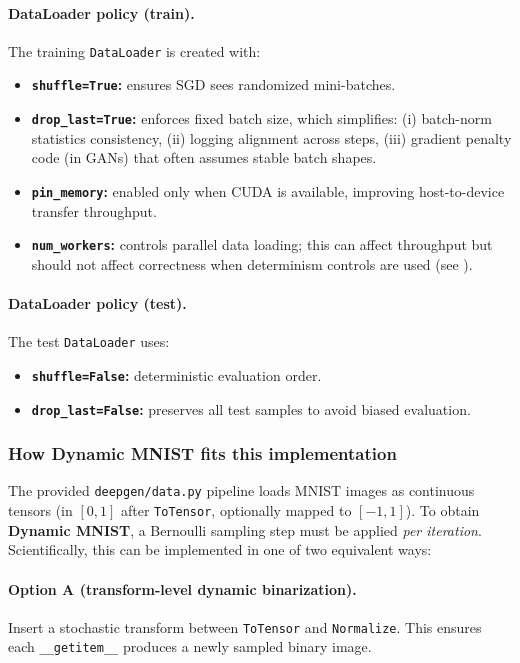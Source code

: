 \paragraph{DataLoader policy (train).}
The training \texttt{DataLoader} is created with:
\begin{itemize}
  \item \textbf{\texttt{shuffle=True}:} ensures SGD sees randomized mini-batches.
  \item \textbf{\texttt{drop\_last=True}:} enforces fixed batch size, which simplifies:
  (i) batch-norm statistics consistency,
  (ii) logging alignment across steps,
  (iii) gradient penalty code (in GANs) that often assumes stable batch shapes.
  \item \textbf{\texttt{pin\_memory}:} enabled only when CUDA is available, improving host-to-device transfer throughput.
  \item \textbf{\texttt{num\_workers}:} controls parallel data loading; this can affect throughput but should not affect correctness when determinism controls are used (see ).
\end{itemize}

\paragraph{DataLoader policy (test).}
The test \texttt{DataLoader} uses:
\begin{itemize}
  \item \textbf{\texttt{shuffle=False}:} deterministic evaluation order.
  \item \textbf{\texttt{drop\_last=False}:} preserves all test samples to avoid biased evaluation.
\end{itemize}

\subsubsection{How Dynamic MNIST fits this implementation}
\label{subsubsec:dynamic_mnist_in_code}
The provided \texttt{deepgen/data.py} pipeline loads MNIST images as continuous tensors (in $[0,1]$ after \texttt{ToTensor}, optionally mapped to $[-1,1]$). To obtain \textbf{Dynamic MNIST}, a Bernoulli sampling step must be applied \emph{per iteration}. Scientifically, this can be implemented in one of two equivalent ways:

\paragraph{Option A (transform-level dynamic binarization).}
Insert a stochastic transform between \texttt{ToTensor} and \texttt{Normalize}. This ensures each \texttt{\_\_getitem\_\_} produces a newly sampled binary image.

